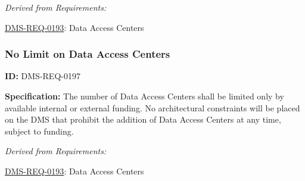 \documentclass[SE,toc,lsstdraft]{lsstdoc}
\begin{document}
\emph{Derived from Requirements:}

\hyperref[DMS-REQ-0193]{DMS-REQ-0193}:
Data Access Centers \newline


\subsubsection{No Limit on Data Access Centers}

\label{DMS-REQ-0197}
\textbf{ID:} DMS-REQ-0197

\textbf{Specification: }The number of Data Access Centers shall be limited only by available internal or external funding.  No architectural constraints will be placed on the DMS that prohibit the addition of Data Access Centers at any time, subject to funding.






\emph{Derived from Requirements:}

\hyperref[DMS-REQ-0193]{DMS-REQ-0193}:
Data Access Centers \newline




\end{document}
